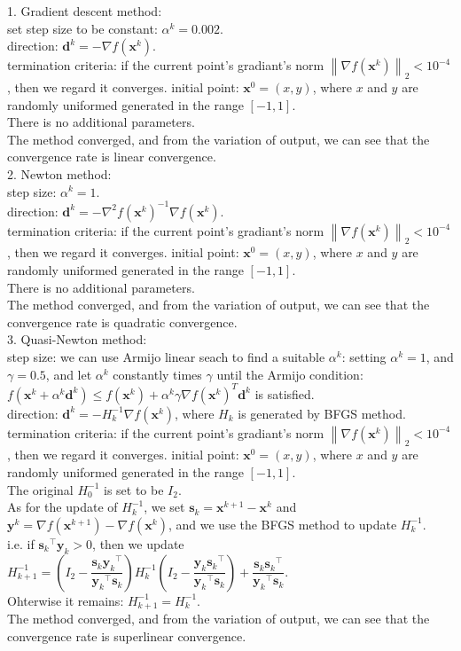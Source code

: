 \documentclass[10pt]{article}
\newcommand{\norm}[2]{\left\| #1 \right\|_{#2}}
\begin{document}
1. Gradient descent method:\\
set step size to be constant: $\alpha^k=0.002$.\\
direction: $\pmb d^k=-\nabla f(\pmb x^k)$.\\
termination criteria: if the current point's gradiant's norm $\norm{\nabla f(\pmb x^k)}{2}<10^{-4}$, then we regard it converges.
initial point: $\pmb x^0=(x,y)$, where $x$ and $y$ are randomly uniformed generated in the range $[-1,1]$.\\
There is no additional parameters.\\
The method converged, and from the variation of output, we can see that the convergence rate is linear convergence.\\

2. Newton method:\\
step size: $\alpha^k=1$.\\
direction: $\pmb d^k = -\nabla^2 f(\pmb x^k)^{-1}\nabla f(\pmb x^k)$.\\
termination criteria: if the current point's gradiant's norm $\norm{\nabla f(\pmb x^k)}{2}<10^{-4}$, then we regard it converges.
initial point: $\pmb x^0=(x,y)$, where $x$ and $y$ are randomly uniformed generated in the range $[-1,1]$.\\
There is no additional parameters.\\
The method converged, and from the variation of output, we can see that the convergence rate is quadratic convergence.\\

3. Quasi-Newton method:\\
step size: we can use Armijo linear seach to find a suitable $\alpha^k$: setting $\alpha^k=1$, and $\gamma=0.5$, and let $\alpha^k$ constantly times $\gamma$ until the Armijo condition: $f(\pmb x^k+\alpha^k\pmb d^k)\leq f(\pmb x^k)+\alpha^k\gamma\nabla f(\pmb x^k)^T\pmb d^k$ is satisfied.\\
direction: $\pmb d^k = -H_k^{-1}\nabla f(\pmb x^k)$, where $H_k$ is generated by BFGS method.\\
termination criteria: if the current point's gradiant's norm $\norm{\nabla f(\pmb x^k)}{2}<10^{-4}$, then we regard it converges.
initial point: $\pmb x^0=(x,y)$, where $x$ and $y$ are randomly uniformed generated in the range $[-1,1]$.\\
The original $H_0^{-1}$ is set to be $I_2$.\\
As for the update of $H_k^{-1}$, we set $\pmb s_k=\pmb x^{k+1}-\pmb x^k$ and $\pmb y^k=\nabla f(\pmb x^{k+1})-\nabla f(\pmb x^k)$, and we use the BFGS method to update $H_k^{-1}$.\\
i.e. if ${\pmb s_k}^{\top}{\pmb y_k}>0$, then we update $H_{k+1}^{-1}=(I_2-\dfrac{{\pmb s_k}{\pmb y_k}^{\top}}{{\pmb y_k}^{\top}{\pmb s_k}})H_k^{-1}(I_2-\dfrac{{\pmb y_k}{\pmb s_k}^{\top}}{{\pmb y_k}^{\top}{\pmb s_k}})+\dfrac{{\pmb s_k}{\pmb s_k}^{\top}}{{\pmb y_k}^{\top}{\pmb s_k}}$.\\
Ohterwise it remains: $H_{k+1}^{-1}=H_k^{-1}$.\\
The method converged, and from the variation of output, we can see that the convergence rate is superlinear convergence.\\
\end{document}
